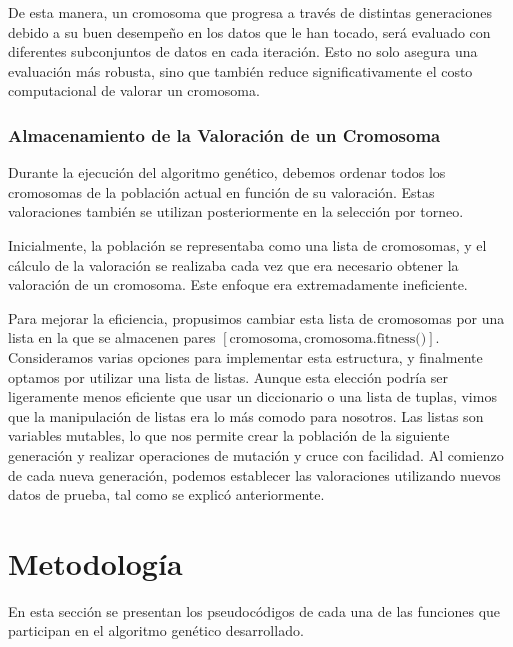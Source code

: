 \documentclass[conference,a4paper]{IEEEtran}
\begin{document}
De esta manera, un cromosoma que progresa a través de distintas generaciones debido a su buen desempeño en los datos que le han tocado, será evaluado con diferentes subconjuntos de datos en cada iteración. Esto no solo asegura una evaluación más robusta, sino que también reduce significativamente el costo computacional de valorar un cromosoma.

\subsubsection{Almacenamiento de la Valoración de un Cromosoma}
Durante la ejecución del algoritmo genético, debemos ordenar todos los cromosomas de la población actual en función de su valoración. Estas valoraciones también se utilizan posteriormente en la selección por torneo.

Inicialmente, la población se representaba como una lista de cromosomas, y el cálculo de la valoración se realizaba cada vez que era necesario obtener la valoración de un cromosoma. Este enfoque era extremadamente ineficiente.

Para mejorar la eficiencia, propusimos cambiar esta lista de cromosomas por una lista en la que se almacenen pares \([\text{cromosoma}, \text{cromosoma.fitness()}]\). Consideramos varias opciones para implementar esta estructura, y finalmente optamos por utilizar una lista de listas. Aunque esta elección podría ser ligeramente menos eficiente que usar un diccionario o una lista de tuplas, vimos que la manipulación de listas era lo más comodo para nosotros. Las listas son variables mutables, lo que nos permite crear la población de la siguiente generación y realizar operaciones de mutación y cruce con facilidad. Al comienzo de cada nueva generación, podemos establecer las valoraciones utilizando nuevos datos de prueba, tal como se explicó anteriormente.


\section{Metodología}

En esta sección se presentan los pseudocódigos de cada una de las funciones que participan en el algoritmo genético desarrollado.
\end{document}

